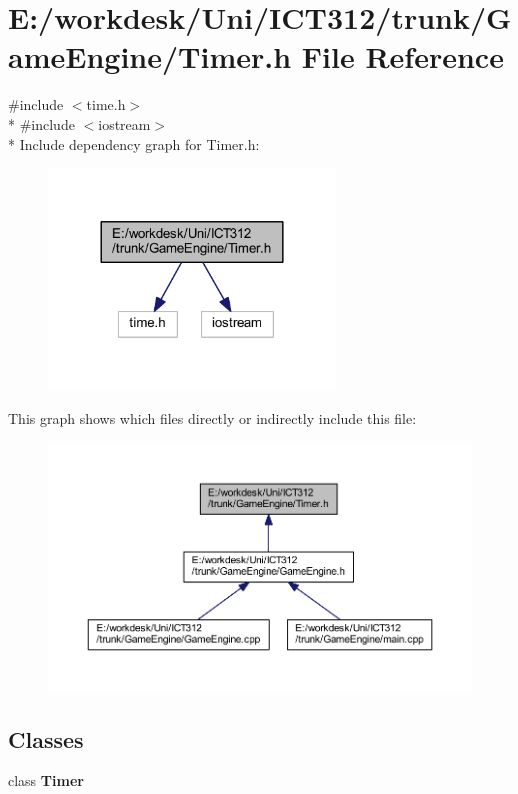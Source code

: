 \section{E\+:/workdesk/\+Uni/\+I\+C\+T312/trunk/\+Game\+Engine/\+Timer.h File Reference}
\label{_timer_8h}
{\ttfamily \#include $<$time.\+h$>$}\\*
{\ttfamily \#include $<$iostream$>$}\\*
Include dependency graph for Timer.\+h\+:\nopagebreak
\begin{figure}[H]
\begin{center}
\leavevmode
\includegraphics[width=216pt]{d4/d71/_timer_8h__incl}
\end{center}
\end{figure}
This graph shows which files directly or indirectly include this file\+:\nopagebreak
\begin{figure}[H]
\begin{center}
\leavevmode
\includegraphics[width=350pt]{dc/d44/_timer_8h__dep__incl}
\end{center}
\end{figure}
\subsection*{Classes}
\begin{DoxyCompactItemize}
\item 
class {\bf Timer}
\end{DoxyCompactItemize}
